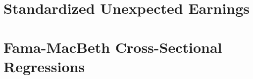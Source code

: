 \documentclass[12pt,a4paper,oneside]{report}
\begin{document}
\section{Standardized Unexpected Earnings}
\label{sec:sue}

\section{Fama-MacBeth Cross-Sectional Regressions}
\label{sec:fama_macbeth}
\end{document}

